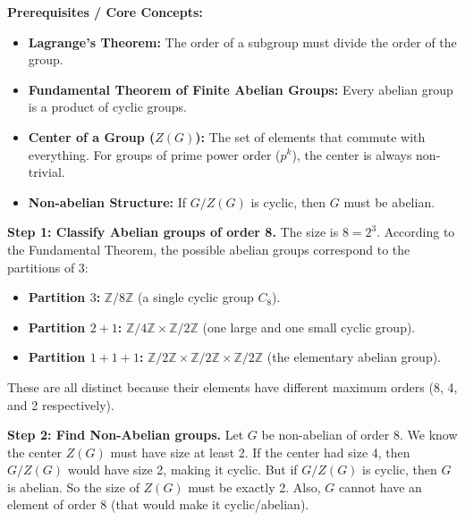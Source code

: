 \begin{solution}
\textbf{Prerequisites / Core Concepts:}
\begin{itemize}
    \item \textbf{Lagrange's Theorem:} The order of a subgroup must divide the order of the group.
    \item \textbf{Fundamental Theorem of Finite Abelian Groups:} Every abelian group is a product of cyclic groups.
    \item \textbf{Center of a Group ($Z(G)$):} The set of elements that commute with everything. For groups of prime power order ($p^k$), the center is always non-trivial.
    \item \textbf{Non-abelian Structure:} If $G/Z(G)$ is cyclic, then $G$ must be abelian.
\end{itemize}

\textbf{Step 1: Classify Abelian groups of order 8.}
The size is $8 = 2^3$. According to the Fundamental Theorem, the possible abelian groups correspond to the partitions of 3:
\begin{itemize}
    \item \textbf{Partition $3$:} $\mathbb{Z}/8\mathbb{Z}$ (a single cyclic group $C_8$).
    \item \textbf{Partition $2+1$:} $\mathbb{Z}/4\mathbb{Z} \times \mathbb{Z}/2\mathbb{Z}$ (one large and one small cyclic group).
    \item \textbf{Partition $1+1+1$:} $\mathbb{Z}/2\mathbb{Z} \times \mathbb{Z}/2\mathbb{Z} \times \mathbb{Z}/2\mathbb{Z}$ (the elementary abelian group).
\end{itemize}
These are all distinct because their elements have different maximum orders (8, 4, and 2 respectively).

\textbf{Step 2: Find Non-Abelian groups.}
Let $G$ be non-abelian of order 8. We know the center $Z(G)$ must have size at least 2.
If the center had size 4, then $G/Z(G)$ would have size 2, making it cyclic. But if $G/Z(G)$ is cyclic, then $G$ is abelian.
So the size of $Z(G)$ must be exactly 2.
Also, $G$ cannot have an element of order 8 (that would make it cyclic/abelian).


\end{solution}

